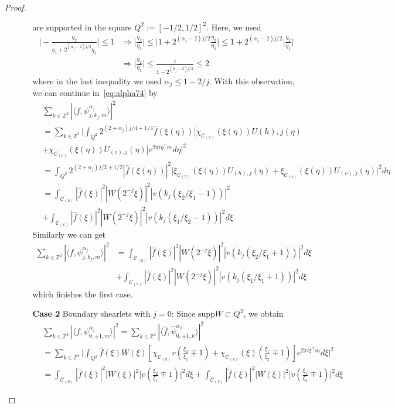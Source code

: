 \begin{proof}
\begin{itemize}
\begin{enumerate}
$$$$
are supported in the square $Q^2:=[-1/2,1/2]^2$. Here, we used
$$
\begin{aligned}
\big|-\frac{\eta_2}{\eta_1+2^{(\alpha_j-2)j/2}\eta_2}\bigg|\leq 1&\Longrightarrow \bigg|\frac{\eta_2}{\eta_1}\bigg|\leq \bigg| 1+2^{(\alpha_j-2)j/2}\frac{\eta_2}{\eta_1}\bigg|\leq 1+2^{(\alpha_j-2)j/2}\bigg|\frac{\eta_2}{\eta_1}\bigg|\\
&\Longrightarrow \bigg|\frac{\eta_2}{\eta_1}\bigg| \leq\frac{1}{1-2^{(\alpha_j-2)j/2}}\leq 2
\end{aligned}
$$
where in the last inequality we used $\alpha_j\leq 1-2/j$. With this observation, we can continue in~\ref{eq:alpha74} by
$$
\begin{aligned}
&\sum_{k\in\mathbb{Z}^2}|\langle f,\psi_{j,k_j,m}^{\alpha_j}\rangle|^2\\
&=\sum_{k\in\mathbb{Z}^2}\bigg|\int_{Q^2}2^{(2+\alpha_j)j/4+1/4}\hat{f}(\xi(\eta))[ \chi_{\mathcal{C}_{(h)}}(\xi(\eta))U{(h),j}(\eta)\\
&+\chi_{\mathcal{C}_{(v)}}(\xi(\eta))U_{(v),j}(\eta)]e^{2\pi i\eta^{\top}m}d\eta\bigg|^2\\
&=\int_{Q^2}2^{(2+\alpha_j)j/2+1/2}|\hat{f}(\xi(\eta))|^2\bigg|\xi_{\mathcal{C}_{(h)}}(\xi(\eta))U_{(h),j}(\eta)+\xi_{\mathcal{C}_{(v)}}(\xi(\eta))U_{(v),j}(\eta)\bigg|^2d\eta\\
&=\int_{\mathcal{C}_{(h)}}|\hat{f}(\xi)|^2|W(2^{-j}\xi)|^2|v(k_j(\xi_2/\xi_1-1))|^2\\
&+\int_{\mathcal{C}_{(v)}}|\hat{f}(\xi)|^2|W(2^{-j}\xi)|^2|v(k_j(\xi_1/\xi_2-1))|^2d\xi.
\end{aligned}
$$
Similarly we can get
$$
\begin{aligned}
\sum_{k\in\mathbb{Z}^2}|\langle f,\psi_{j,k_j,m}^{\alpha_j}\rangle|^2&=\int_{\mathcal{C}_{(h)}}|\hat{f}(\xi)|^2|W(2^{-j}\xi)|^2|v(k_j(\xi_2/\xi_1+1))|^2d\xi\\
&+\int_{\mathcal{C}_{(v)}}|\hat{f}(\xi)|^2|W(2^{-j}\xi)|^2|v(k_j(\xi_1/\xi_1+1))|^2d\xi
\end{aligned}
$$
which finishes the first case.

\item[\textbf{Case 2}] Boundary shearlets with $j=0$: Since $\text{supp}W\subset Q^2$, we obtain
$$
\begin{aligned}
&\sum_{k\in\mathbb{Z}^2}|\langle f,\psi_{0,\pm 1,m}^{\alpha_j}\rangle|^2=\sum_{k\in\mathbb{Z}^2}|\langle \hat{f},\hat{\psi}_{0,\pm 1,k}^{\alpha_j}\rangle|^2\\
&=\sum_{k\in\mathbb{Z}^2}\bigg|\int_{Q^2}\hat{f}(\xi)W(\xi)\left[\chi_{\mathcal{C}_{(h)}}v\left(\frac{\xi_2}{\xi_1}\mp 1\right) +\chi_{\mathcal{C}_{(v)}}(\xi)\left(\frac{\xi_1}{\xi_2}\mp 1\right)\right]e^{2\pi i\xi^{\top}m}d\xi\bigg|^2\\
&=\int_{\mathcal{C}_{(h)}}|\hat{f}(\xi)|^2|W(\xi)|^2\bigg| v\left(\frac{\xi_2}{\xi_1}\mp 1\right)\bigg|^2d\xi+\int_{\mathcal{C}_{(v)}}|\hat{f}(\xi)|^2|W(\xi)|^2\bigg|v\left(\frac{\xi_1}{\xi_2}\mp 1\right)\bigg|^2d\xi
\end{aligned}
$$


\end{enumerate}
\end{itemize}
\end{proof}
